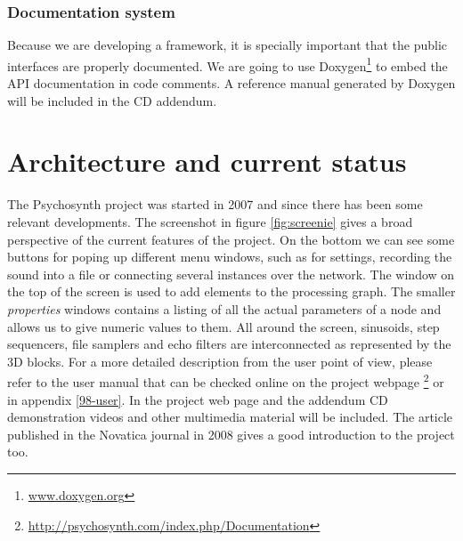 \subsubsection{Documentation system}

Because we are developing a framework, it is specially important that
the public interfaces are properly documented. We are going to use
Doxygen\footnote{\url{www.doxygen.org}} to embed the
API documentation in code comments. A reference manual generated by
Doxygen will be included in the CD addendum.

\section{Architecture and current status}
\label{sec:status}

The Psychosynth project was started in 2007 and since there has been
some relevant developments. The screenshot in figure
\ref{fig:screenie} gives a broad perspective of the current features
of the project. On the bottom we can see some buttons for poping up
different menu windows, such as for settings, recording the sound into
a file or connecting several instances over the network. The window on
the top of the screen is used to add elements to the processing
graph. The smaller \emph{properties} windows contains a listing of all
the actual parameters of a node and allows us to give numeric values
to them. All around the screen, sinusoids, step sequencers, file
samplers and echo filters are interconnected as represented by the 3D
blocks.  For a more detailed description from the user point of view,
please refer to the user manual that can be checked online on the
project webpage
\footnote{\url{http://psychosynth.com/index.php/Documentation}} or in
appendix \ref{98-user}. In the project web page and the addendum CD
demonstration videos and other multimedia material will be
included. The article \cite{bolivar08psychosynth} published in the
Novatica journal in 2008 gives a good introduction to the project too.

